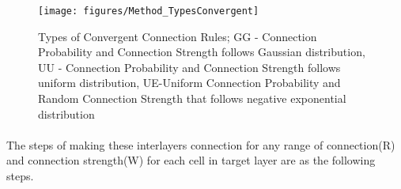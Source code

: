 \begin{figure}[!h]
	\centering
	\texttt{[image: figures/Method\_TypesConvergent]}
	\caption{Types of Convergent Connection Rules; GG - Connection Probability and Connection Strength follows Gaussian distribution, UU - Connection Probability and Connection Strength follows uniform distribution, UE-Uniform Connection Probability and Random Connection Strength that follows negative exponential distribution }
	\label{fig:ConvergentRule}
\end{figure} 

\paragraph{} The steps of making these interlayers connection for any range of connection(R) and connection strength(W) for each cell in target layer are as the following steps. 

